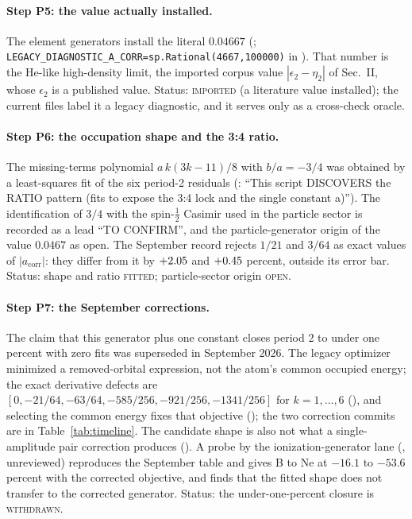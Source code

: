 \documentclass[aps,prd,onecolumn,amsmath,amssymb,longbibliography,floatfix,nofootinbib]{revtex4-2}
\newcommand{\acorr}{a_{\mathrm{corr}}}
\newcommand{\st}[1]{\textsc{#1}}
\begin{document}
\paragraph{Step P5: the value actually installed.} The element generators install the literal $0.04667$ (; \texttt{LEGACY\_DIAGNOSTIC\_A\_CORR=sp.Rational(4667,100000)} in ). That number is the He-like high-density limit, the imported corpus value $|\epsilon_2-\eta_2|$ of Sec.~II, whose $\epsilon_2$ is a published value. Status: \st{imported} (a literature value installed); the current files label it a legacy diagnostic, and it serves only as a cross-check oracle.

\paragraph{Step P6: the occupation shape and the 3:4 ratio.} The missing-terms polynomial $a\,k(3k-11)/8$ with $b/a=-3/4$ was obtained by a least-squares fit of the six period-2 residuals (: ``This script DISCOVERS the RATIO pattern (fits to expose the 3:4 lock and the single constant a)''). The identification of $3/4$ with the spin-$\tfrac12$ Casimir used in the particle sector is recorded as a lead ``TO CONFIRM'', and the particle-generator origin of the value $0.0467$ as open. The September record rejects $1/21$ and $3/64$ as exact values of $|\acorr|$: they differ from it by $+2.05$ and $+0.45$ percent, outside its error bar. Status: shape and ratio \st{fitted}; particle-sector origin \st{open}.

\paragraph{Step P7: the September corrections.} The claim that this generator plus one constant closes period 2 to under one percent with zero fits was superseded in September 2026. The legacy optimizer minimized a removed-orbital expression, not the atom's common occupied energy; the exact derivative defects are $[0,-21/64,-63/64,\allowbreak -585/256,\allowbreak -921/256,\allowbreak -1341/256]$ for $k=1,\dots,6$ (), and selecting the common energy fixes that objective (); the two correction commits are in Table~\ref{tab:timeline}. The candidate shape is also not what a single-amplitude pair correction produces (). A probe by the ionization-generator lane (\RefIon, unreviewed) reproduces the September table and gives B to Ne at $-16.1$ to $-53.6$ percent with the corrected objective, and finds that the fitted shape does not transfer to the corrected generator. Status: the under-one-percent closure is \st{withdrawn}.
\end{document}
